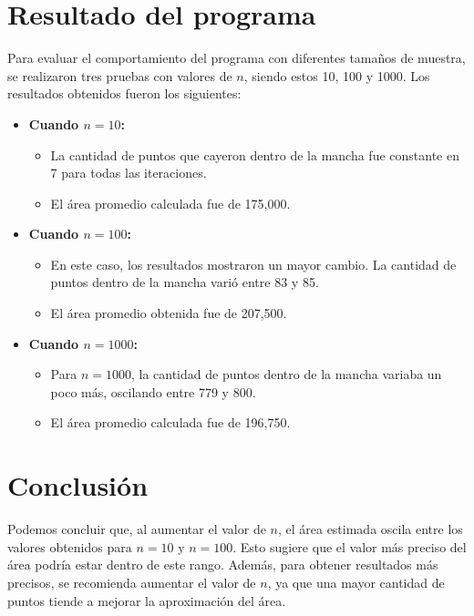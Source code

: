 \documentclass[a4paper, 10pt]{article}
\begin{document}
\section*{Resultado del programa}

Para evaluar el comportamiento del programa con diferentes tamaños de muestra, se realizaron tres pruebas con valores de \( n \), siendo estos 10, 100 y 1000. Los resultados obtenidos fueron los siguientes:

\begin{itemize}
    \item \textbf{Cuando \( n = 10 \):}
    \begin{itemize}
        \item La cantidad de puntos que cayeron dentro de la mancha fue constante en 7 para todas las iteraciones.
        \item El área promedio calculada fue de 175,000.
    \end{itemize}
    
    \item \textbf{Cuando \( n = 100 \):}
    \begin{itemize}
        \item En este caso, los resultados mostraron un mayor cambio. La cantidad de puntos dentro de la mancha varió entre 83 y 85.
        \item El área promedio obtenida fue de 207,500.
    \end{itemize}
    
    \item \textbf{Cuando \( n = 1000 \):}
    \begin{itemize}
        \item Para \( n = 1000 \), la cantidad de puntos dentro de la mancha variaba un poco más, oscilando entre 779 y 800.
        \item El área promedio calculada fue de 196,750.
    \end{itemize}
\end{itemize}

\section*{Conclusión}

Podemos concluir que, al aumentar el valor de \( n \), el área estimada oscila entre los valores obtenidos para \( n = 10 \) y \( n = 100 \). Esto sugiere que el valor más preciso del área podría estar dentro de este rango. Además, para obtener resultados más precisos, se recomienda aumentar el valor de \( n \), ya que una mayor cantidad de puntos tiende a mejorar la aproximación del área.
\end{document}
